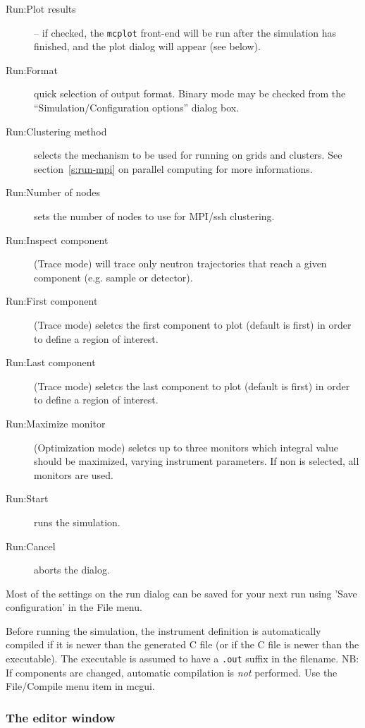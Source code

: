 \begin{description}
\item[Run:Plot results] -- if checked, the \verb+mcplot+ front-end will be run
  after the simulation has finished, and the plot dialog will appear
  (see below).
\item[Run:Format] quick selection of output format. Binary mode may be checked from the ``Simulation/Configuration options'' dialog box.
\item[Run:Clustering method] selects the mechanism to be used for running on grids and clusters.
  See section~\ref{s:run-mpi} on parallel computing for more informations.
\item[Run:Number of nodes] sets the number of nodes to use for MPI/ssh clustering.
\item[Run:Inspect component] (Trace mode) will trace only neutron trajectories that reach a given component (e.g. sample or detector).
\item[Run:First component] (Trace mode) seletcs the first component to plot (default is first) in order to define a region of interest.
\item[Run:Last component] (Trace mode) seletcs the last component to plot (default is first) in order to define a region of interest.
\item[Run:Maximize monitor] (Optimization mode) seletcs up to three monitors which integral value should be maximized, varying instrument parameters. If non is selected, all monitors are used.
\item[Run:Start] runs the simulation.
\item[Run:Cancel] aborts the dialog.
\end{description}
Most of the settings on the run dialog can be saved for your next
\MCS run using 'Save configuration' in the File menu.

Before running the simulation, the instrument definition is
automatically compiled if it is newer than the generated C file (or if the C file
is newer than the executable). The executable is
assumed to have a \verb+.out+ suffix in the filename. NB: If
components are changed, automatic compilation is \emph{not}
performed. Use the File/Compile menu item in mcgui.



\subsubsection{The editor window}

